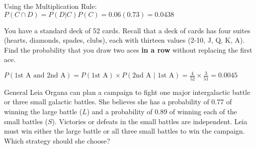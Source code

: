 \documentclass[noanswers]{exam}
\begin{document}
\begin{questions}
\begin{solution}[\stretch{1}]
\vspace{3mm}
Using the Multiplication Rule: $P(C \cap D) = P(D|C)P(C) = 0.06(0.73) = 0.0438$
\vspace{1mm}
\end{solution}

\question You have a standard deck of 52 cards. Recall that a deck of cards has four suites (hearts, diamonds, spades, clubs), each with thirteen values (2-10, J, Q, K, A). Find the probability that you draw two aces \textbf{in a row} without replacing the first ace. 
	
	\begin{solution}[\stretch{1}]
	\vspace{1mm}
	$P(\text{1st A and 2nd A})=P(\text{1st A})\times P(\text{2nd A }|\text{ 1st A})=\frac{4}{52}\times\frac{3}{51}=0.0045$
	\vspace{1mm}
	\end{solution}
	
\question General Leia Organa can plan a campaign to fight one major intergalactic battle or three small galactic battles. She believes she has a probability of 0.77 of winning the large battle ($L$) and a probability of 0.89 of winning each of the small battles ($S$). Victories or defeats in the small battles are independent. Leia must win either the large battle or all three small battles to win the campaign. Which strategy should she choose?

\vspace{3mm}

\end{questions}
\end{document}
